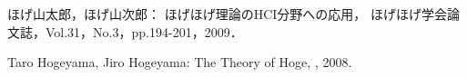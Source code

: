 \begin{bib}[100]


  ほげ山太郎，ほげ山次郎：
  \newblock ほげほげ理論のHCI分野への応用，
  \newblock ほげほげ学会論文誌，Vol.31，No.3，pp.194-201，2009．

  Taro Hogeyama, Jiro Hogeyama:
  \newblock The Theory of Hoge,
  , 2008.
	
\end{bib}